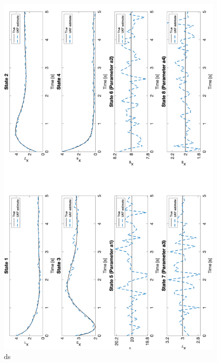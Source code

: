 \begin{figure}[h]
    \centering
    \includegraphics[scale = 0.5]{UKF_4param.png}
    \caption{ds}
    \label{fig:UKF_4param}
\end{figure}

